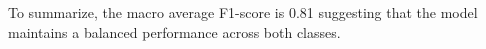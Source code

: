 To summarize, the macro average F1-score is 0.81 suggesting that the model maintains a balanced performance across both classes.



